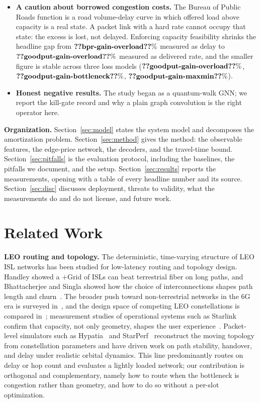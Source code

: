 \documentclass[journal]{IEEEtran}
\begin{document}
\begin{itemize}
\item \textbf{A caution about borrowed congestion costs.} The Bureau of Public Roads function is
a road volume-delay curve in which offered load above capacity is a real state. A packet link
with a hard rate cannot occupy that state: the excess is lost, not delayed. Enforcing capacity
feasibility shrinks the headline gap from $\clm{bpr-gain-overload}\%$ measured as delay to $\clm{goodput-gain-overload}\%$ measured as delivered rate, and the smaller figure is stable across three loss models ($\clm{goodput-gain-overload}\%$, $\clm{goodput-gain-bottleneck}\%$, $\clm{goodput-gain-maxmin}\%$).

\item \textbf{Honest negative results.} The study began as a quantum-walk GNN; we report the
kill-gate record and why a plain graph convolution is the right operator here.
\end{itemize}

\textbf{Organization.} Section~\ref{sec:model} states the system model and
decomposes the amortization problem. Section~\ref{sec:method} gives the method: the observable
features, the edge-price network, the decoders, and the travel-time bound.
Section~\ref{sec:pitfalls} is the evaluation protocol, including the baselines, the pitfalls we
document, and the setup. Section~\ref{sec:results} reports the measurements, opening with a table
of every headline number and its source. Section~\ref{sec:disc} discusses deployment, threats to
validity, what the measurements do and do not license, and future work.

\section{Related Work}
\textbf{LEO routing and topology.} The deterministic, time-varying structure of LEO ISL networks has been studied for low-latency routing and topology design. Handley showed a $+$Grid of ISLs can beat terrestrial fiber on long paths, and Bhattacherjee and Singla showed how the choice of interconnections shapes path length and churn~\cite{handley2018,bhattacherjee2019}. The broader push toward non-terrestrial networks in the
$6$G era is surveyed in~\cite{kodheli,giordani}, and the design space of competing LEO
constellations is compared in~\cite{delportillo}; measurement studies of operational
systems such as Starlink confirm that capacity, not only geometry, shapes the user
experience~\cite{michel}. Packet-level simulators such as Hypatia~\cite{hypatia} and
StarPerf~\cite{starperf} reconstruct the moving topology from constellation parameters and
have driven work on path stability, handover, and delay under realistic orbital dynamics.
This line predominantly routes on delay or hop count and evaluates a lightly loaded
network; our contribution is orthogonal and complementary, namely how to route when the
bottleneck is congestion rather than geometry, and how to do so without a per-slot
optimization.
\end{document}
